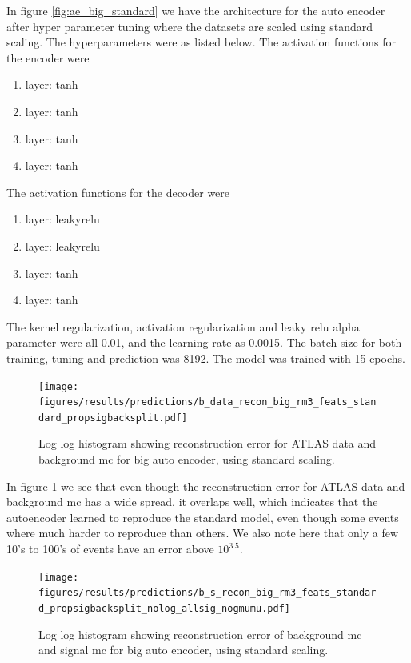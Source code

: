 \documentclass[ reprint, amsmath,amssymb, aps, nofootinbib]{revtex4-2}
\begin{document}
In figure \ref{fig:ae_big_standard} we have the architecture for the auto encoder after hyper parameter tuning where the datasets are scaled using standard scaling. The hyperparameters were as listed below. 
The activation functions for the encoder were
\begin{enumerate}
    \item layer: tanh
    \item layer: tanh
    \item layer: tanh
    \item layer: tanh
\end{enumerate}
The activation functions for the decoder were 
\begin{enumerate}
    \item layer: leakyrelu
    \item layer: leakyrelu
    \item layer: tanh
    \item layer: tanh
\end{enumerate}

The kernel regularization, activation regularization and leaky relu alpha parameter were all 0.01, and the learning rate as 0.0015. The batch size for both training, tuning and prediction was 8192. The model was trained with 15 epochs.

\begin{figure}[H]
     \centering
         \texttt{[image: figures/results/predictions/b\_data\_recon\_big\_rm3\_feats\_standard\_propsigbacksplit.pdf]}
         \caption{Log log histogram showing reconstruction error for ATLAS data and background mc for big auto encoder, using standard scaling.}
     \label{fig:data_b_big_pred_stand}
\end{figure}

In figure \ref{fig:data_b_big_pred_stand} we see that even though the reconstruction error for ATLAS data and background mc has a wide spread, it overlaps well, which indicates that the autoencoder learned to reproduce the standard model, even though some events where much harder to reproduce than others. We also note here that only a few 10's to 100's of events have an error above $10^{3.5}$. 

\begin{figure}[H]
    \centering
    \texttt{[image: figures/results/predictions/b\_s\_recon\_big\_rm3\_feats\_standard\_propsigbacksplit\_nolog\_allsig\_nogmumu.pdf]}
    \caption{Log log histogram showing reconstruction error of background mc and signal mc for big auto encoder, using standard scaling. }
    \label{fig:s_b_big_pred_stand}
\end{figure}
\end{document}

